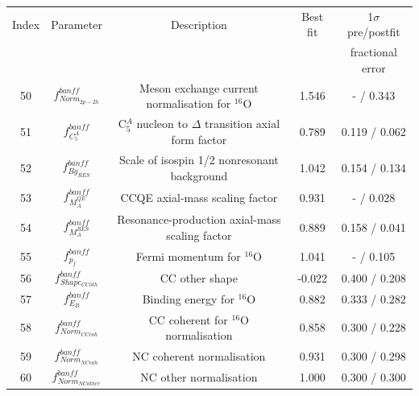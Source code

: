 {%

\begin{table}
\centering
\begin{tabular}{| c | c | c | c | c |}
\hline
           Index & Parameter & Description & Best fit & 1$\sigma$ pre/postfit \\
           & & & & fractional error \\
\hline

50   &  $f_{Norm_{2p-2h}}^{banff}$     & Meson exchange current normalisation for $^{16}$O           & 1.546   & - / 0.343 \\ 
51   &   $f_{C^{A}_{5}}^{banff}$    & C$^{A}_{5}$ nucleon to $\Delta$ transition axial form factor& 0.789   & 0.119 / 0.062 \\ 
52   &    $f_{Bg_{RES}}^{banff}$   & Scale of isospin 1/2 nonresonant background                 & 1.042   & 0.154 / 0.134 \\ 
53   &    $f_{M_A^{QE}}^{banff}$   & CCQE axial-mass scaling factor                              & 0.931   & - / 0.028 \\ 
54    &    $f_{M_A^{RES}}^{banff}$  & Resonance-production axial-mass scaling factor              & 0.889   & 0.158 / 0.041 \\ 
55     &   $f_{p_{f}}^{banff}$  & Fermi momentum for $^{16}$O                                 & 1.041   & - / 0.105 \\ 
56     &   $f_{Shape_{CCoth}}^{banff}$  & CC other shape                                              & -0.022  & 0.400 / 0.208 \\ 
57     &   $f_{E_{B}}^{banff}$  & Binding energy for $^{16}$O                                 & 0.882   & 0.333 / 0.282 \\ 
58     &   $f_{Norm_{CCcoh}}^{banff}$ & CC coherent for $^{16}$O normalisation                      & 0.858   & 0.300 / 0.228 \\ 
59     &    $f_{Norm_{NCcoh}}^{banff}$ & NC coherent normalisation                                   & 0.931   & 0.300 / 0.298 \\ 
60     &   $f_{Norm_{NCother}}^{banff}$  & NC other normalisation                                      & 1.000   & 0.300 / 0.300 \\ 

\end{tabular}
\end{table}}
